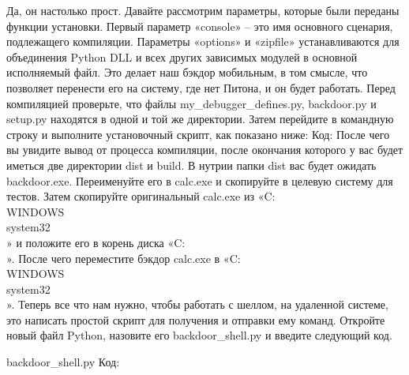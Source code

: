 \documentclass[12pt]{book}
\begin{document}
Да, он настолько прост. Давайте рассмотрим параметры, которые были переданы функции установки. Первый параметр «console» – это имя основного сценария, подлежащего компиляции. Параметры «options» и «zipfile» устанавливаются для объединения Python DLL и всех других зависимых модулей в основной исполняемый файл. Это делает наш бэкдор мобильным, в том смысле, что позволяет перенести его на систему, где нет Питона, и он будет работать. Перед компиляцией проверьте, что файлы my\_debugger\_defines.py, backdoor.py и setup.py находятся в одной и той же директории. Затем перейдите в командную строку и выполните установочный скрипт, как показано ниже:
Код:
После чего вы увидите вывод от процесса компиляции, после окончания которого у вас будет иметься две директории dist и build. В нутрии папки dist вас будет ожидать backdoor.exe. Переименуйте его в calc.exe и скопируйте в целевую систему для тестов. Затем скопируйте оригинальный calc.exe из «C:\\WINDOWS\\system32\\» и положите его в корень диска «C:\\». После чего переместите бэкдор calc.exe в «C:\\WINDOWS\\system32\\». Теперь все что нам нужно, чтобы работать с шеллом, на удаленной системе, это написать простой скрипт для получения и отправки ему команд. Откройте новый файл Python, назовите его backdoor\_shell.py и введите следующий код.

backdoor\_shell.py
Код:







\end{document}
